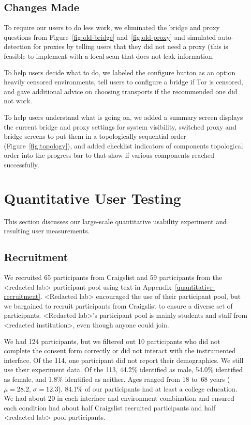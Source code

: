 \documentclass[USenglish,oneside,twocolumn]{article}
\begin{document}
\subsection{Changes Made} 
To require our users to do less work, we eliminated the bridge and proxy questions from Figure~\ref{fig:old-bridge} and~\ref{fig:old-proxy} and simulated auto-detection for proxies by telling users that they did not need a proxy (this is feasible to implement with a local scan that does not leak information. 

To help users decide what to do, we labeled the configure button as an option heavily censored environments, tell users to configure a bridge if Tor is censored, and gave additional advice on choosing transports if the recommended one did not work.

To help users understand what is going on, we added a summary screen displays the current bridge and proxy settings for system visibility, switched proxy and bridge screens to put them in a topologically sequential order (Figure~\ref{fig:topology}), and added checklist indicators of components topological order into the progress bar to that show if various components reached successfully.

\section{Quantitative User Testing}
\label{sec:quantitative}
This section discusses our large-scale quantitative usability experiment and resulting user measurements. 

\subsection{Recruitment}
We recruited 65 participants from Craigslist and 59 participants from the <redacted lab> participant pool using text in Appendix~\ref{quantitative-recruitment}. <Redacted lab> encouraged the use of their participant pool, but we bargained to recruit participants from Craigslist to ensure a diverse set of participants. <Redacted lab>'s participant pool is mainly students and staff from <redacted institution>, even though anyone could join. 

We had 124 participants, but we filtered out 10 participants who did not complete the consent form correctly or did not interact with the instrumented interface. Of the 114, one participant did not report their demographics. We still use their experiment data. Of the 113, 44.2\% identified as male, 54.0\% identified as female, and 1.8\% identified as neither. Ages ranged from 18 to~68 years ($\mu = 28.2$, $\sigma = 12.3$). 84.1\% of our participants had at least a college education. We had about 20 in each interface and environment combination and ensured each condition had about half Craigslist recruited participants and half <redacted lab>  pool participants. 
\end{document}
